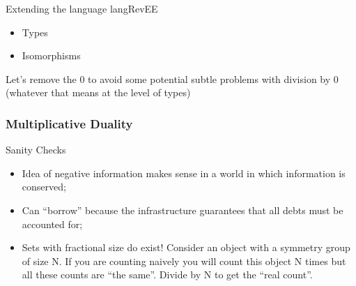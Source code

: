 \documentclass[11pt]{beamer}
\newcommand{\red}[1]{{\color{red}{#1}}}
\begin{document}
\begin{frame}{Extending the language {{langRevEE}} } 

\begin{itemize}
\vfill\item Types
\vfill\item Isomorphisms
\end{itemize}

\vfill

Let's remove the {{0}} to avoid some potential subtle problems with division
by {{0}} (whatever that means at the level of types)

\end{frame}

\begin{frame}
\frametitle{Multiplicative Duality}

\begin{multicols}{2}
\begin{center}
\end{center}

\begin{center}
\end{center}  
\end{multicols}

\end{frame}

\begin{frame}{Sanity Checks}

\begin{itemize}
  \vfill\item Idea of negative information makes sense in a world in which
  information is conserved;

\vfill\item Can ``borrow'' because the infrastructure guarantees that all
debts must be accounted for;

\vfill\item Sets with fractional size do exist! \red{Intuition:} Consider an
object with a symmetry group of size {{N}}. If you are counting naively you
will count this object {{N}} times but all these counts are ``the
same''. Divide by {{N}} to get the ``real count''.

\end{itemize}

\end{frame}
\end{document}
